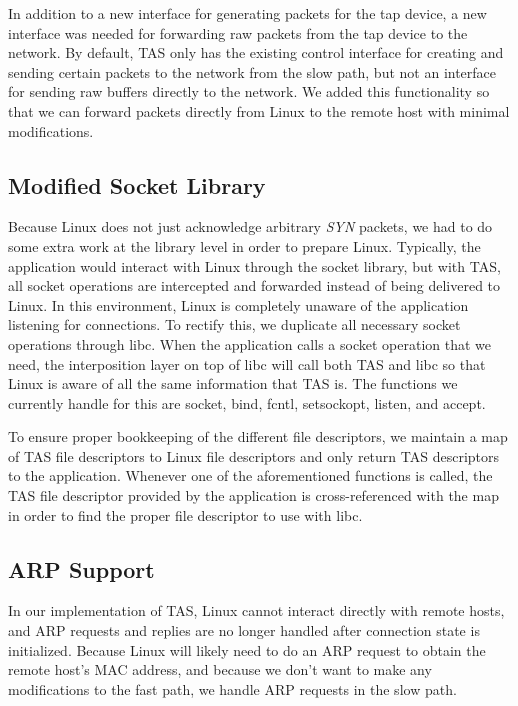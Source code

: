 In addition to a new interface for generating packets for the tap device, a new
interface was needed for forwarding raw packets from the tap device to the 
network. By default, TAS only has the existing control interface for 
creating and sending certain packets to the network from the slow path, but 
not an interface for sending raw buffers directly to the network. We added this
functionality so that we can forward packets directly from Linux to the remote
host with minimal modifications.

\subsection{Modified Socket Library}

Because Linux does not just acknowledge arbitrary \textit{SYN} packets, we had to do some
extra work at the library level in order to prepare Linux. Typically, the 
application would interact with Linux through the socket library, but with 
TAS, all socket operations are intercepted and forwarded instead of being
delivered to Linux. In this environment, Linux is completely unaware of the 
application listening for connections. To rectify this, we duplicate all 
necessary socket operations through libc. When the application calls a socket 
operation that we need, the interposition layer on top of libc will call both 
TAS and libc so that Linux is aware of all the same information that 
TAS is. The functions we currently handle for this are socket, bind, 
fcntl, setsockopt, listen, and accept. 

To ensure proper bookkeeping of the different file descriptors, we maintain a map
of TAS file descriptors to Linux file descriptors and only return TAS
descriptors to the application. Whenever one of the aforementioned functions is 
called, the TAS file descriptor provided by the application is 
cross-referenced with the map in order to find the proper file descriptor to use
with libc. 

\subsection{ARP Support}

In our implementation of TAS, Linux cannot interact directly with remote 
hosts, and ARP requests and replies are no longer handled after connection state
is initialized. Because Linux will likely need to do an ARP request to obtain 
the remote host's MAC address, and because we don't want to make any 
modifications to the fast path, we handle ARP requests in the slow path.

